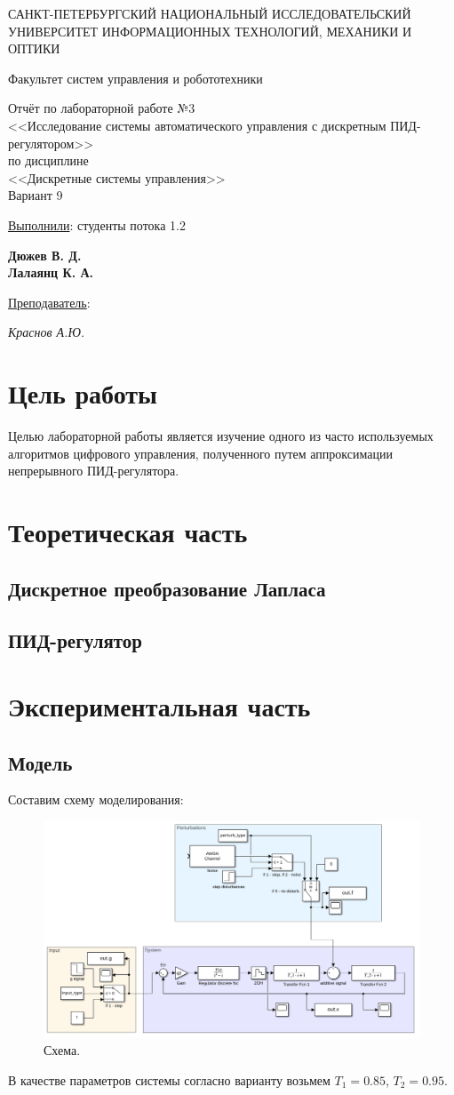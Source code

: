 \documentclass[a4paper, 14pt]{extarticle}
\theoremstyle{definition}
\theoremstyle{plain}
\theoremstyle{remark}
\newcommand*{\titlePage}{
	\thispagestyle{title}
	\begingroup
	\begin{center}
		\vspace*{3ex}
		{\small
			САНКТ-ПЕТЕРБУРГСКИЙ НАЦИОНАЛЬНЫЙ ИССЛЕДОВАТЕЛЬСКИЙ УНИВЕРСИТЕТ ИНФОРМАЦИОННЫХ ТЕХНОЛОГИЙ, МЕХАНИКИ И ОПТИКИ	
		}
		
		\vspace*{2ex}
		
		{\normalsize
			Факультет систем управления и робототехники
		}
		
		\vspace*{15ex}
		
		{
			Отчёт по лабораторной работе №3\\
			<<Исследование системы автоматического управления с дискретным ПИД-регулятором>>\\
			по дисциплине\\
			<<Дискретные системы управления>>\\
				Вариант 9
			
		}
		
	\end{center}
	\vspace*{10ex}
	\begin{flushright}
		{\large 
			\underline{Выполнили}: студенты потока 1.2 \\
			\begin{flushright}
				\textbf{Дюжев В. Д.}\\
				\textbf{Лалаянц К. А.}\\
			\end{flushright}
		}
		\vspace*{5ex}
		{\large 
			\underline{Преподаватель}:\\ 
			\begin{flushright}
            \textit{Краснов А.Ю.}
			\end{flushright}
		}
	\end{flushright}	
	\newpage
	\setcounter{page}{1}
	\endgroup}
\begin{document}
\renewcommand{\contentsname}{\hfillОГЛАВЛЕНИЕ\hfill} 
\titlePage
\thispagestyle{plain}
\tableofcontents
\pagestyle{style}

\newpage
\setcounter{page}{1}

% 

\section{Цель работы}
Целью лабораторной работы является изучение одного из часто используемых алгоритмов 
цифрового управления, полученного путем аппроксимации непрерывного ПИД-регулятора.

\section{Теоретическая часть}

\subsection{Дискретное преобразование Лапласа}

\subsection{ПИД-регулятор}



\section{Экспериментальная часть}

\subsection{Модель}
Составим схему моделирования:
\begin{figure}
    [H]
    \centering
    \includegraphics[width=\textwidth]{images/scheme.png}
    \caption{Схема.}
    \label{fig:scheme}
\end{figure}
В качестве параметров системы согласно варианту возьмем $T_1 = 0.85$, $T_2 = 0.95$.
\end{document}
